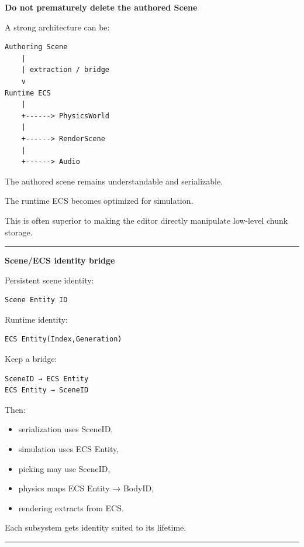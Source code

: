 \textbf{Do not prematurely delete the authored Scene}

A strong architecture can be:

\begin{verbatim}
Authoring Scene
    |
    | extraction / bridge
    v
Runtime ECS
    |
    +------> PhysicsWorld
    |
    +------> RenderScene
    |
    +------> Audio
\end{verbatim}

The authored scene remains understandable and serializable.

The runtime ECS becomes optimized for simulation.

This is often superior to making the editor directly manipulate low-level chunk storage.

\begin{center}\rule{0.5\linewidth}{0.5pt}\end{center}

\textbf{Scene/ECS identity bridge}

Persistent scene identity:

\begin{verbatim}
Scene Entity ID
\end{verbatim}

Runtime identity:

\begin{verbatim}
ECS Entity(Index,Generation)
\end{verbatim}

Keep a bridge:

\begin{verbatim}
SceneID → ECS Entity
ECS Entity → SceneID
\end{verbatim}

Then:

\begin{itemize}
\tightlist
\item
  serialization uses SceneID,
\item
  simulation uses ECS Entity,
\item
  picking may use SceneID,
\item
  physics maps ECS Entity → BodyID,
\item
  rendering extracts from ECS.
\end{itemize}

Each subsystem gets identity suited to its lifetime.

\begin{center}\rule{0.5\linewidth}{0.5pt}\end{center}

